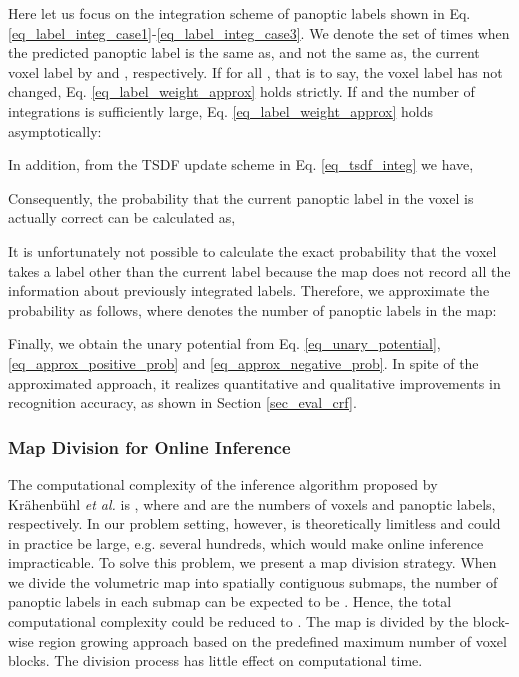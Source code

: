 \documentclass[letterpaper, 10pt, conference]{latex_template/ieeeconf}
\begin{document}
Here let us focus on the integration scheme of panoptic labels shown in Eq. \eqref{eq_label_integ_case1}-\eqref{eq_label_integ_case3}.
We denote the set of times when the predicted panoptic label is the same as, and not the same as, the current voxel label by  and , respectively.
If  for all , that is to say, the voxel label has not changed, Eq. \eqref{eq_label_weight_approx} holds strictly.
If  and the number of integrations is sufficiently large, Eq. \eqref{eq_label_weight_approx} holds asymptotically:

In addition, from the TSDF update scheme in Eq. \eqref{eq_tsdf_integ} we have,

Consequently, the probability that the current panoptic label in the voxel is actually correct can be calculated as,

It is unfortunately not possible to calculate the exact probability that the voxel takes a label other than the current label because the map does not record all the information about previously integrated labels.
Therefore, we approximate the probability as follows, where  denotes the number of panoptic labels in the map:


Finally, we obtain the unary potential from Eq. \eqref{eq_unary_potential}, \eqref{eq_approx_positive_prob} and \eqref{eq_approx_negative_prob}.
In spite of the approximated approach, it realizes quantitative and qualitative improvements in recognition accuracy, as shown in Section \ref{sec_eval_crf}.


\subsubsection{Map Division for Online Inference}
The computational complexity of the inference algorithm proposed by Kr{\"a}henb{\"u}hl {\it et al.} \cite{krahenbuhl2011efficient} is , where  and  are the numbers of voxels and panoptic labels, respectively.
In our problem setting, however,  is theoretically limitless and could in practice be large, e.g. several hundreds, which would make online inference impracticable.
To solve this problem, we present a map division strategy.
When we divide the volumetric map into  spatially contiguous submaps, the number of panoptic labels in each submap can be expected to be .
Hence, the total computational complexity could be reduced to .
The map is divided by the block-wise region growing approach based on the predefined maximum number of voxel blocks. The division process has little effect on computational time.
\end{document}
